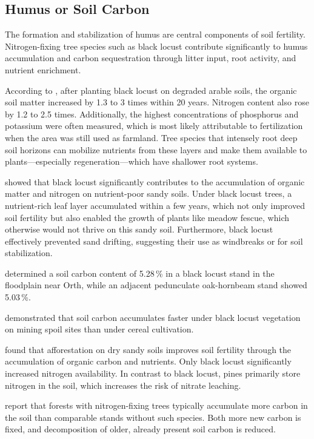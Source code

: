 \subsection{Humus or Soil Carbon}

The formation and stabilization of humus are central components of soil fertility. Nitrogen-fixing tree species such as black locust contribute significantly to humus accumulation and carbon sequestration through litter input, root activity, and nutrient enrichment.

According to \citet{papaioannou2016robinieBoden}, after planting black locust on degraded arable soils, the organic soil matter increased by 1.3 to 3 times within 20 years. Nitrogen content also rose by 1.2 to 2.5 times. Additionally, the highest concentrations of phosphorus and potassium were often measured, which is most likely attributable to fertilization when the area was still used as farmland. Tree species that intensely root deep soil horizons can mobilize nutrients from these layers and make them available to plants—especially regeneration—which have shallower root systems.

\citet{gustafson1935robinie} showed that black locust significantly contributes to the accumulation of organic matter and nitrogen on nutrient-poor sandy soils. Under black locust trees, a nutrient-rich leaf layer accumulated within a few years, which not only improved soil fertility but also enabled the growth of plants like meadow fescue, which otherwise would not thrive on this sandy soil. Furthermore, black locust effectively prevented sand drifting, suggesting their use as windbreaks or for soil stabilization.

\citet{kastler2013robinieBoden} determined a soil carbon content of 5.28\,\% in a black locust stand in the floodplain near Orth, while an adjacent pedunculate oak-hornbeam stand showed 5.03\,\%.

\citet{kanzler2021robinieBodenc} demonstrated that soil carbon accumulates faster under black locust vegetation on mining spoil sites than under cereal cultivation.

\citet{gurlevik2016longterm} found that afforestation on dry sandy soils improves soil fertility through the accumulation of organic carbon and nutrients. Only black locust significantly increased nitrogen availability. In contrast to black locust, pines primarily store nitrogen in the soil, which increases the risk of nitrate leaching.

\citet{resh2002nFixUndC} report that forests with nitrogen-fixing trees typically accumulate more carbon in the soil than comparable stands without such species. Both more new carbon is fixed, and decomposition of older, already present soil carbon is reduced.

